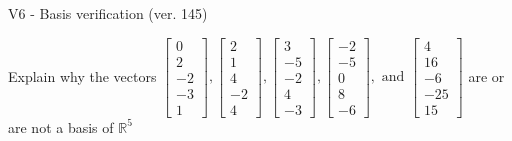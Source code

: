 \begin{exercise}
  \begin{exerciseTitle}V6 - Basis verification (ver. 145)\end{exerciseTitle}
  \begin{exerciseStatement}
    Explain why the vectors \(\left[\begin{array}{r}
0 \\
2 \\
-2 \\
-3 \\
1
\end{array}\right] , \left[\begin{array}{r}
2 \\
1 \\
4 \\
-2 \\
4
\end{array}\right] , \left[\begin{array}{r}
3 \\
-5 \\
-2 \\
4 \\
-3
\end{array}\right] , \left[\begin{array}{r}
-2 \\
-5 \\
0 \\
8 \\
-6
\end{array}\right] , \text{ and } \left[\begin{array}{r}
4 \\
16 \\
-6 \\
-25 \\
15
\end{array}\right]\) are or are not a basis of \(\mathbb{R}^5\)	



\end{exerciseStatement}
\end{exercise}
